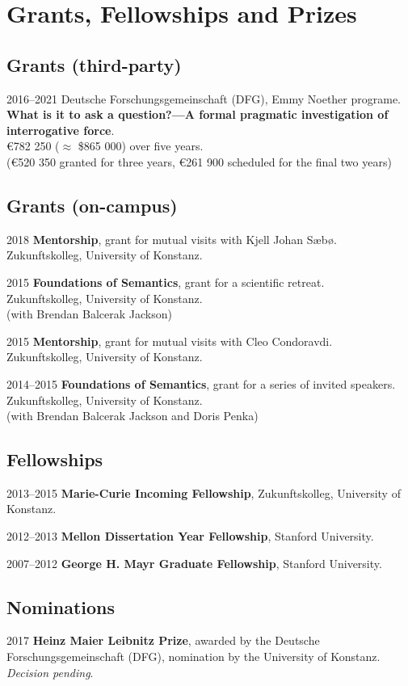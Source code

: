 \section*{Grants, Fellowships and Prizes}
\subsection*{Grants (third-party)}
\begin{dated}
	\item[2016--2021] 
		Deutsche Forschungsgemeinschaft (DFG), Emmy Noether programe.\\ 
		\textbf{What is it to ask a question?---A formal pragmatic investigation of interrogative force}.\\
		\euro 782 250 ($\approx$ \$865 000) over five years. \\
		(\euro 520 350 granted for three years, \euro 261 900 scheduled for the final two years)
\end{dated}
%
\subsection*{Grants (on-campus)}
\begin{dated}
	\item[2018]
		\textbf{Mentorship}, grant for mutual visits with Kjell Johan S{\ae}b{\o}.\\ 
		Zukunftskolleg, University of Konstanz.
	\item[2015] 
		\textbf{Foundations of Semantics}, grant for a scientific retreat.\\
		Zukunftskolleg, University of Konstanz.\\
		(with Brendan Balcerak Jackson)
	\item[2015]
		\textbf{Mentorship}, grant for mutual visits with Cleo Condoravdi.\\ 
		Zukunftskolleg, University of Konstanz.
	\item[2014--2015]
		 \textbf{Foundations of Semantics}, grant for a series of invited speakers.\\
		Zukunftskolleg, University of Konstanz.\\
		(with Brendan Balcerak Jackson and Doris Penka)\\
\end{dated}
%
\subsection*{Fellowships}
\begin{dated}
	\item[2013--2015]
		\textbf{Marie-Curie Incoming Fellowship}, Zukunftskolleg, University of Konstanz.
	\item[2012--2013]
		\textbf{Mellon Dissertation Year Fellowship}, Stanford University.
	\item[2007--2012]
		\textbf{George H. Mayr Graduate Fellowship}, Stanford University.
\end{dated}
%
\subsection*{Nominations}
\begin{dated}
	\item[2017]
		\textbf{Heinz Maier Leibnitz Prize}, awarded by the Deutsche Forschungsgemeinschaft (DFG), nomination by the University of Konstanz.
		\textit{Decision pending}.
\end{dated}